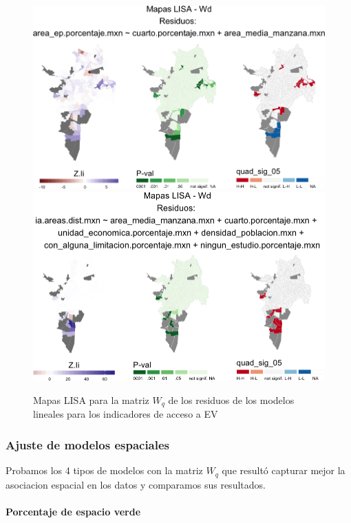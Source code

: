 \documentclass[12pt,]{book}
\let\oldparagraph\paragraph
\renewcommand{\paragraph}[1]{\oldparagraph{#1}\mbox{}}
\begin{document}
\begin{figure}
\includegraphics[width=1\linewidth]{tesis-unigis_files/figure-latex/mapas-lisa-resev-wq-1} \includegraphics[width=1\linewidth]{tesis-unigis_files/figure-latex/mapas-lisa-resev-wq-2} \caption{Mapas LISA para la matriz $W_q$ de los residuos de los modelos lineales para los indicadores de acceso a EV}\label{fig:mapas-lisa-resev-wq}
\end{figure}

\subsubsection{Ajuste de modelos
espaciales}\label{ajuste-de-modelos-espaciales-1}

Probamos los 4 tipos de modelos con la matriz \(W_q\) que resultó
capturar mejor la asociacion espacial en los datos y comparamos sus
resultados.

\paragraph{Porcentaje de espacio
verde}\label{porcentaje-de-espacio-verde}
\end{document}
